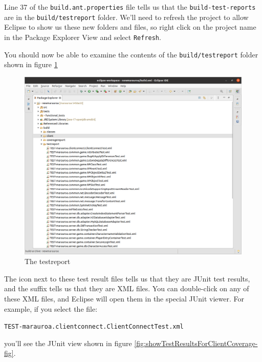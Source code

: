\documentclass[
]{book}
\begin{document}
Line 37 of the \texttt{build.ant.properties} file tells us that the \texttt{build-test-reports} are in the \texttt{build/testreport} folder. We'll need to refresh the project to allow Eclipse to show us these new folders and files, so right click on the project name in the Package Explorer View and select \texttt{Refresh}.

You should now be able to examine the contents of the \texttt{build/testreport} folder shown in figure \ref{fig:showJUnitTestResultsInXMLFormat-fig}

\begin{figure}

{\centering \includegraphics[width=1\linewidth]{images/3.2.4showJUnitTestResultsInXMLFormat} 

}

\caption{The testreport}\label{fig:showJUnitTestResultsInXMLFormat-fig}
\end{figure}

The icon next to these test result files tells us that they are JUnit test results, and the suffix tells us that they are XML files. You can double-click on any of these XML files, and Eclipse will open them in the special JUnit viewer. For example, if you select the file:

\texttt{TEST-marauroa.clientconnect.ClientConnectTest.xml}

you'll see the JUnit view shown in figure \ref{fig:showTestResultsForClientCoverage-fig}.
\end{document}
